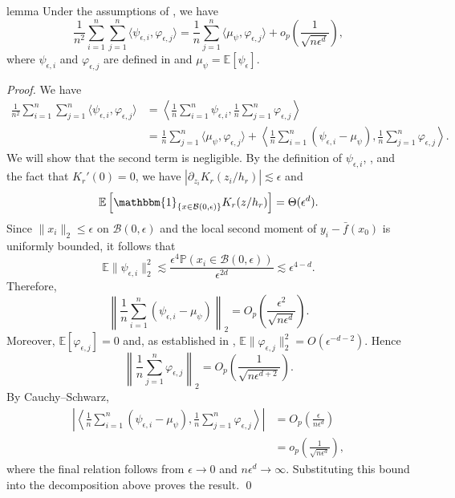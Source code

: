 \documentclass[11pt]{article}
\begin{document}
\begin{appendices}
\begin{restatable}{lemma}{} \label{lemma: inner prod decomp}
    Under the assumptions of , we have 
    \[
        \frac{1}{n^2} \sum_{i = 1}^n\sum_{j = 1}^n\langle\psi_{\epsilon, i}, \varphi_{\epsilon, j}\rangle
        =
        \frac{1}{n}\sum_{j = 1}^n\langle\mu_{\psi}, \varphi_{\epsilon, j}\rangle
        +
        o_p\left(\frac{1}{\sqrt{n\epsilon^d}}\right),
    \]
    where $\psi_{\epsilon,i}$ and $\varphi_{\epsilon,j}$ are defined in  and $\mu_{\psi} = \mathbb{E}[\psi_{\epsilon}]$.
\end{restatable}
\noindent \textit{Proof.} We have
\begin{align*}
    \frac{1}{n^2} \sum_{i = 1}^n\sum_{j = 1}^n\langle\psi_{\epsilon, i}, \varphi_{\epsilon, j}\rangle
    &=
    \left\langle\frac{1}{n}\sum_{i = 1}^n\psi_{\epsilon,i},
    \frac{1}{n}\sum_{j = 1}^n\varphi_{\epsilon,j}\right\rangle \\
    &=
    \frac{1}{n}\sum_{j = 1}^n\langle\mu_\psi,\varphi_{\epsilon,j}\rangle
    +
    \left\langle
    \frac{1}{n}\sum_{i = 1}^n(\psi_{\epsilon,i}-\mu_\psi),
    \frac{1}{n}\sum_{j = 1}^n\varphi_{\epsilon,j}
    \right\rangle.
\end{align*}
We will show that the second term is negligible. By the definition of $\psi_{\epsilon,i}$, , and the fact that $K_r'(0)=0$, we have $\left|\partial_{z_i}K_r(z_i/h_r)\right|\lesssim\epsilon$ and
\[
    \mathbb{E}\left[\mathbbm{1}_{\{x\in\mathcal{B}(0,\epsilon)\}}K_r(z/h_r)\right]
    = \Theta(\epsilon^d).
\]
Since $\|x_i\|_2\leq\epsilon$ on $\mathcal{B}(0,\epsilon)$ and the local second moment of $y_i-\bar f(x_0)$ is uniformly bounded, it follows that
\[
    \mathbb{E}\|\psi_{\epsilon,i}\|_2^2
    \lesssim
    \frac{\epsilon^4\mathbb{P}(x_i\in\mathcal{B}(0,\epsilon))}{\epsilon^{2d}}
    \lesssim
    \epsilon^{4-d}.
\]
Therefore,
\[
    \left\|
    \frac{1}{n}\sum_{i=1}^n(\psi_{\epsilon,i}-\mu_\psi)
    \right\|_2
    =
    O_p\left(\frac{\epsilon^2}{\sqrt{n\epsilon^d}}\right).
\]
Moreover, $\mathbb{E}[\varphi_{\epsilon,j}]=0$ and, as established in , $\mathbb{E}\|\varphi_{\epsilon,j}\|_2^2=O(\epsilon^{-d-2})$. Hence
\[
    \left\|
    \frac{1}{n}\sum_{j=1}^n\varphi_{\epsilon,j}
    \right\|_2
    =
    O_p\left(\frac{1}{\sqrt{n\epsilon^{d+2}}}\right).
\]
By Cauchy--Schwarz,
\begin{align*}
    \left|
    \left\langle
    \frac{1}{n}\sum_{i=1}^n(\psi_{\epsilon,i}-\mu_\psi),
    \frac{1}{n}\sum_{j=1}^n\varphi_{\epsilon,j}
    \right\rangle
    \right|
    &=
    O_p\left(\frac{\epsilon}{n\epsilon^d}\right) \\
    &=
    o_p\left(\frac{1}{\sqrt{n\epsilon^d}}\right),
\end{align*}
where the final relation follows from $\epsilon\rightarrow0$ and $n\epsilon^d\rightarrow\infty$. Substituting this bound into the decomposition above proves the result.
\qed{}




\end{appendices}
\end{document}

